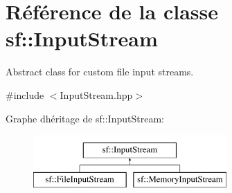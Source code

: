 \hypertarget{classsf_1_1InputStream}{}\section{Référence de la classe sf\+:\+:Input\+Stream}
\label{classsf_1_1InputStream}


Abstract class for custom file input streams.  




{\ttfamily \#include $<$Input\+Stream.\+hpp$>$}

Graphe d\textquotesingle{}héritage de sf\+:\+:Input\+Stream\+:\begin{figure}[H]
\begin{center}
\leavevmode
\includegraphics[height=2.000000cm]{classsf_1_1InputStream}
\end{center}
\end{figure}
